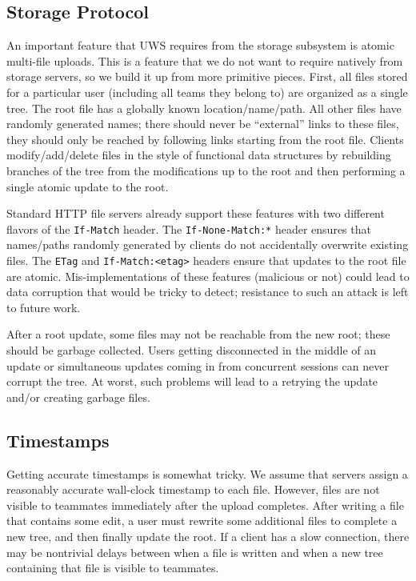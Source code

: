 \documentclass{article}
\begin{document}
\subsection{Storage Protocol}

An important feature that UWS requires from the storage subsystem is atomic multi-file uploads.
This is a feature that we do not want to require natively from storage servers, so we build it up from more primitive pieces.
First, all files stored for a particular user (including all teams they belong to) are organized as a single tree.
The root file has a globally known location{\slash}name{\slash}path.
All other files have randomly generated names; there should never be ``external'' links to these files, they should only be reached by following links starting from the root file.
Clients modify{\slash}add{\slash}delete files in the style of functional data structures by rebuilding branches of the tree from the modifications up to the root and then performing a single atomic update to the root.

Standard HTTP file servers already support these features with two different flavors of the \texttt{If-Match} header.
The \texttt{If-None-Match:*} header ensures that names{\slash}paths randomly generated by clients do not accidentally overwrite existing files.
The \texttt{ETag} and \texttt{If-Match:<etag>} headers ensure that updates to the root file are atomic.
Mis-implementations of these features (malicious or not) could lead to data corruption that would be tricky to detect; resistance to such an attack is left to future work.

After a root update, some files may not be reachable from the new root; these should be garbage collected.
Users getting disconnected in the middle of an update or simultaneous updates coming in from concurrent sessions can never corrupt the tree.
At worst, such problems will lead to a retrying the update and{\slash}or creating garbage files.

\subsection{Timestamps}

Getting accurate timestamps is somewhat tricky.
We assume that servers assign a reasonably accurate wall-clock timestamp to each file.
However, files are not visible to teammates immediately after the upload completes.
After writing a file that contains some edit, a user must rewrite some additional files to complete a new tree, and then finally update the root.
If a client has a slow connection, there may be nontrivial delays between when a file is written and when a new tree containing that file is visible to teammates.
\end{document}
